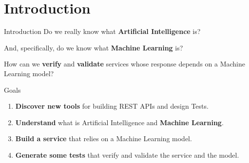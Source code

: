 \section{Introduction}
\begin{frame}{Introduction}
    Do we really know what \textbf{Artificial Intelligence} is?

    \pause

    And, specifically, do we know what \textbf{Machine Learning} is?

    \pause

    How can we \textbf{verify} and \textbf{validate} services whose response depends on a Machine Learning model?
\end{frame}

\begin{frame}{Goals}
    \begin{enumerate}[<+->]
        \item \textbf{Discover new tools} for building REST APIs and design Tests.
        \item \textbf{Understand} what is Artificial Intelligence and \textbf{Machine Learning}.
        \item \textbf{Build a service} that relies on a Machine Learning model.
        \item \textbf{Generate some tests} that verify and validate the service and the model.
    \end{enumerate}
\end{frame}

